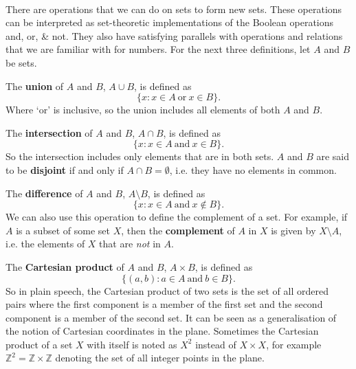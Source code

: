 \documentclass[../real_analysis.tex]{subfiles}
\begin{document}
        \paragraph{}
        There are operations that we can do on sets to form new sets. These operations can be interpreted as set-theoretic implementations of the Boolean operations and, or, \& not. They also have satisfying parallels with operations and relations that we are familiar with for numbers. For the next three definitions, let $A$ and $B$ be sets.
        \begin{definition}
            The \textbf{union} of $A$ and $B$, $A \cup B$, is defined as
            \[\{x: x \in A\ \text{or}\ x \in B\}.\]
            Where `or' is inclusive, so the union includes all elements of both $A$ and $B$.
        \end{definition}
        \begin{definition}
            The \textbf{intersection} of $A$ and $B$, $A \cap B$, is defined as
            \[\{x: x \in A\ \text{and}\ x \in B\}.\]
            So the intersection includes only elements that are in both sets. $A$ and $B$ are said to be \textbf{disjoint} if and only if $A \cap B = \emptyset$, i.e. they have no elements in common.
        \end{definition}
        \begin{definition}
            The \textbf{difference} of $A$ and $B$, $A \setminus B$, is defined as
            \[\{x: x \in A\ \text{and}\ x \notin B\}.\]
            We can also use this operation to define the complement of a set. For example, if $A$ is a subset of some set $X$, then the \textbf{complement} of $A$ in $X$ is given by $X \setminus A$, i.e. the elements of $X$ that are \textit{not} in $A$.
        \end{definition}
        \begin{definition}
            The \textbf{Cartesian product} of $A$ and $B$, $A\times B$, is defined as
            \[\{(a, b): a \in A\ \text{and}\ b \in B\}.\]
            So in plain speech, the Cartesian product of two sets is the set of all ordered pairs where the first component is a member of the first set and the second component is a member of the second set. It can be seen as a generalisation of the notion of Cartesian coordinates in the plane. Sometimes the Cartesian product of a set $X$ with itself is noted as $X^2$ instead of $X \times X$, for example $\mathbb{Z}^2 = \mathbb{Z} \times \mathbb{Z}$ denoting the set of all integer points in the plane.
        \end{definition}
\end{document}
